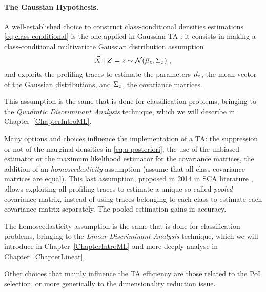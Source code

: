 \paragraph*{The Gaussian Hypothesis.} A well-established choice to construct class-conditional densities estimations \ref{eq:class-conditional} is the one applied in Gaussian TA \cite{Chari2003}: it consists in making a class-conditional multivariate Gaussian distribution assumption
\begin{equation}\label{eq:gaussian_assumption}
\given{\vaLeakVec}{\sensRandVar} =\sensVar \sim \mathcal{N}(\mumumu_\sensVar, \Sigma_\sensVar)\mbox{ ,}
\end{equation} 
and exploits the profiling traces to estimate the  parameters $\vec{\mu}_z$, \ie the mean vector of the Gaussian distributions, and $ \Sigma_z$, \ie the covariance matrices. \\

\begin{remark}This assumption is the same that is done for classification problems, bringing to the \emph{Quadratic Discriminant Analysis} technique, which we will describe in Chapter~\ref{ChapterIntroML}. 
\end{remark}

Many options and choices influence the implementation of a TA: the suppression or not of the marginal densities in \eqref{eq:a-posteriori}, the use of the unbiased estimator or the maximum likelihood estimator for the covariance matrices, the addition of an \emph{homoscedasticity} assumption (assume that all class-covariance matrices are equal). This last assumption, proposed in 2014 in SCA literature \cite{choudary2014efficient},  allows exploiting all profiling traces to estimate a unique so-called \emph{pooled} covariance matrix, instead of using traces belonging to each class to estimate each covariance matrix separately. The pooled estimation gains in accuracy. 

\begin{remark}
The homoscedasticity assumption is the same that is done for classification problems, bringing to the \emph{Linear Discriminant Analysis} technique, which we will introduce in Chapter~\ref{ChapterIntroML} and more deeply analyse in Chapter~\ref{ChapterLinear}.  
\end{remark}

Other choices that mainly influence the TA efficiency are those related to the PoI selection, or more generically to the dimensionality reduction issue.

